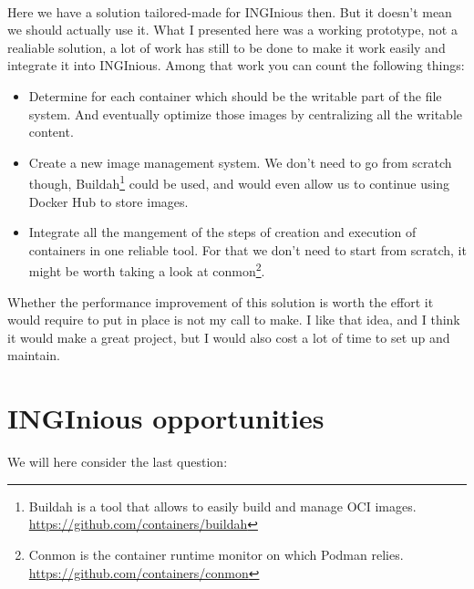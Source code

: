 \paragraph{}Here we have a solution tailored-made for INGInious then.  But it doesn't mean we should actually use it.  What I presented here was a working prototype, not a realiable solution, a lot of work has still to be done to make it work easily and integrate it into INGInious.  Among that work you can count the following things:
\begin{itemize}
  \item Determine for each container which should be the writable part of the file system.  And eventually optimize those images by centralizing all the writable content.
  \item Create a new image management system.  We don't need to go from scratch though, Buildah\footnote{Buildah is a tool that allows to easily build and manage OCI images. \href{https://github.com/containers/buildah}{https://github.com/containers/buildah}} could be used, and would even allow us to continue using Docker Hub to store images.
  \item Integrate all the mangement of the steps of creation and execution of containers in one reliable tool.  For that we don't need to start from scratch, it might be worth taking a look at conmon\footnote{Conmon is the container runtime monitor on which Podman relies.  \href{https://github.com/containers/conmon}{https://github.com/containers/conmon}}.
\end{itemize}

Whether the performance improvement of this solution is worth the effort it would require to put in place is not my call to make. I like that idea, and I think it would make a great project, but I would also cost a lot of time to set up and maintain.

\section{INGInious opportunities}
We will here consider the last question:
\begin{center}
\end{center}

